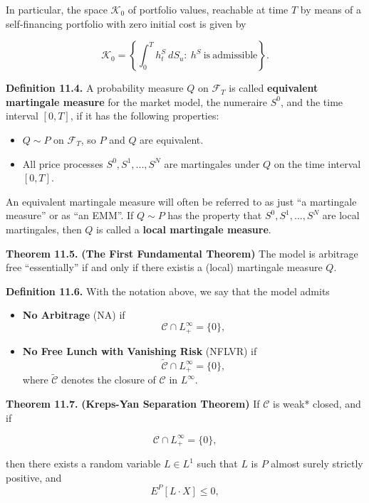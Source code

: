 \documentclass[
]{article}
\providecommand{\tightlist}{%
  \setlength{\itemsep}{0pt}\setlength{\parskip}{0pt}}
\begin{document}
In particular, the space \(\mathcal{K}_0\) of portfolio values,
reachable at time \(T\) by means of a self-financing portfolio with zero
initial cost is given by

\[
\mathcal{K}_0=\left\{\int_0^Th_t^S\ dS_u :\ h^S\ \text{is}\ \text{admissible}\right\}.
\]

\textbf{Definition 11.4.} A probability measure \(Q\) on
\(\mathcal{F}_T\) is called \textbf{equivalent martingale measure} for
the market model, the numeraire \(S^0\), and the time interval
\([0,T]\), if it has the following properties:

\begin{itemize}
\tightlist
\item
  \(Q\sim P\) on \(\mathcal{F}_T\), so \(P\) and \(Q\) are equivalent.
\item
  All price processes \(S^0,S^1,...,S^N\) are martingales under \(Q\) on
  the time interval \([0,T]\).
\end{itemize}

An equivalent martingale measure will often be referred to as just ``a
martingale measure'' or as ``an EMM''. If \(Q\sim P\) has the property
that \(S^0,S^1,...,S^N\) are local martingales, then \(Q\) is called a
\textbf{local martingale measure}.

\textbf{Theorem 11.5.} \textbf{(The First Fundamental Theorem)} The
model is arbitrage free ``essentially'' if and only if there existis a
(local) martingale measure \(Q\).

\textbf{Definition 11.6.} With the notation above, we say that the model
admits

\begin{itemize}
\tightlist
\item
  \textbf{No Arbitrage} (NA) if \[
    \mathcal{C}\cap L_+^\infty=\{0\},
    \]
\item
  \textbf{No Free Lunch with Vanishing Risk} (NFLVR) if \[
    \tilde{\mathcal{C}}\cap L_+^\infty=\{0\},
    \] where \(\tilde{\mathcal{C}}\) denotes the closure of
  \(\mathcal{C}\) in \(L^\infty\).
\end{itemize}

\textbf{Theorem 11.7.} \textbf{(Kreps-Yan Separation Theorem)} If
\(\mathcal{C}\) is weak* closed, and if

\[
\mathcal{C}\cap L_+^\infty=\{0\},
\]

then there exists a random variable \(L\in L^1\) such that \(L\) is
\(P\) almost surely strictly positive, and \[
E^P[L\cdot X]\le 0,
\]
\end{document}
